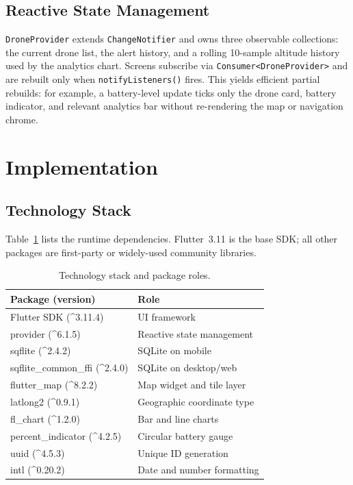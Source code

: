 \documentclass[conference]{IEEEtran}
\begin{document}
\subsection{Reactive State Management}

\texttt{DroneProvider} extends \texttt{ChangeNotifier} and owns three observable collections: the current drone list, the alert history, and a rolling 10-sample altitude history used by the analytics chart. Screens subscribe via \texttt{Consumer<DroneProvider>} and are rebuilt only when \texttt{notifyListeners()} fires. This yields efficient partial rebuilds: for example, a battery-level update ticks only the drone card, battery indicator, and relevant analytics bar without re-rendering the map or navigation chrome.

\section{Implementation}
\label{sec:impl}

\subsection{Technology Stack}

Table~\ref{tab:stack} lists the runtime dependencies. Flutter~3.11 is the base SDK; all other packages are first-party or widely-used community libraries.

\begin{table}[!t]
\caption{Technology stack and package roles.}
\label{tab:stack}
\centering
\footnotesize
\begin{tabular}{@{}ll@{}}
\toprule
\textbf{Package (version)} & \textbf{Role} \\
\midrule
Flutter SDK (\^{}3.11.4) & UI framework \\
provider (\^{}6.1.5) & Reactive state management \\
sqflite (\^{}2.4.2) & SQLite on mobile \\
sqflite\_common\_ffi (\^{}2.4.0) & SQLite on desktop/web \\
flutter\_map (\^{}8.2.2) & Map widget and tile layer \\
latlong2 (\^{}0.9.1) & Geographic coordinate type \\
fl\_chart (\^{}1.2.0) & Bar and line charts \\
percent\_indicator (\^{}4.2.5) & Circular battery gauge \\
uuid (\^{}4.5.3) & Unique ID generation \\
intl (\^{}0.20.2) & Date and number formatting \\
\bottomrule
\end{tabular}
\end{table}
\end{document}
